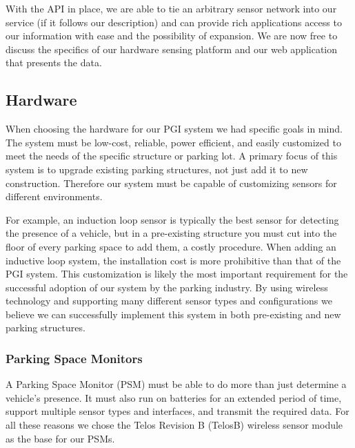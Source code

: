 \documentclass{acm_proc}
\begin{document}
With the API in place, we are able to tie an arbitrary sensor network into
our service (if it follows our description) and can provide rich
applications access to our information with ease and the possibility of
expansion.
We are now free to discuss the specifics of our hardware sensing platform
and our web application that presents the data.

\subsection{Hardware}

When choosing the hardware for our PGI system we had specific goals in mind.
The system must be low-cost, reliable, power efficient, and easily
customized to meet the needs of the specific structure or parking lot.
A primary focus of this system is to upgrade existing parking structures, not just add it to new construction.
Therefore our system must be capable of customizing sensors for different
environments.

For example, an induction loop sensor is typically the best sensor for
detecting the presence of a vehicle, but in a pre-existing structure you
must cut into the floor of every parking space to add them, a costly
procedure.
When adding an inductive loop system, the installation cost is more prohibitive
than that of the PGI system.
This customization is likely the most important requirement for the successful
adoption of our system by the parking industry.
By using wireless technology and supporting many different sensor types and
configurations we believe we can successfully implement this system in both
pre-existing and new parking structures.

\subsubsection{Parking Space Monitors}

A Parking Space Monitor (PSM) must be able to do more than just determine a vehicle's presence.
It must also run on batteries for an extended period of time, support
multiple sensor types and interfaces, and transmit the required data.
For all these reasons we chose the Telos Revision B (TelosB) wireless
sensor module as the base for our PSMs.
\end{document}
